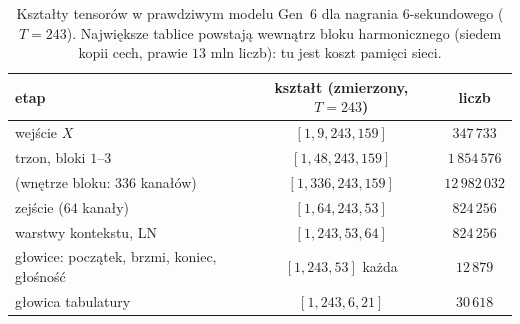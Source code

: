 \begin{table}[ht]
\centering\small
\begin{tabular}{@{}lcc@{}}
\toprule
etap & kształt (zmierzony, $T=243$) & liczb\\
\midrule
wejście $X$ & $[1,9,243,159]$ & $347\,733$\\
trzon, bloki $1$--$3$ & $[1,48,243,159]$ & $1\,854\,576$\\
(wnętrze bloku: $336$ kanałów) & $[1,336,243,159]$ & $12\,982\,032$\\
zejście ($64$ kanały) & $[1,64,243,53]$ & $824\,256$\\
warstwy kontekstu, LN & $[1,243,53,64]$ & $824\,256$\\
głowice: początek, brzmi, koniec, głośność & $[1,243,53]$ każda & $12\,879$\\
głowica tabulatury & $[1,243,6,21]$ & $30\,618$\\
\bottomrule
\end{tabular}
\caption{Kształty tensorów w prawdziwym modelu Gen~6 dla nagrania $6$-sekundowego ($T=243$). Największe tablice powstają wewnątrz bloku harmonicznego (siedem kopii cech, prawie $13$ mln liczb): tu jest koszt pamięci sieci.}
\label{tab:ksztalty}
\end{table}

